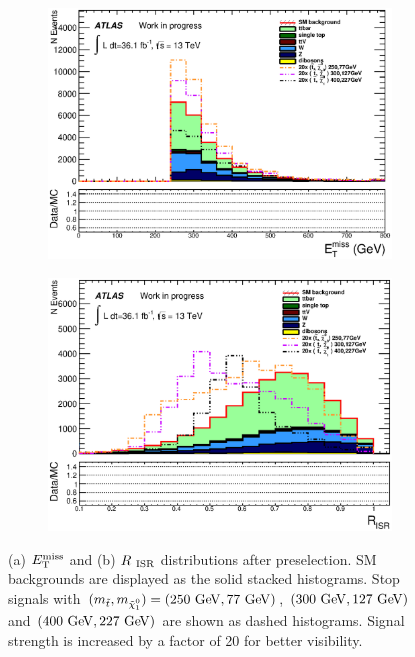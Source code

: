 \begin{figure}[h!]
  \begin{center}
    \begin{subfigure}[a]{0.45\textwidth}    
    	\includegraphics[width=\textwidth]{figures/plotSR/SR_eT_miss_0SR.eps}\hspace{0.05\textwidth}
                \caption{ }
                \label{fig:presel_dist_met} 
    \end{subfigure}
    \begin{subfigure}[b]{0.45\textwidth}
    	\includegraphics[width=\textwidth]{figures/plotSR/SR_ND1_RISR_0SR.eps}\hspace{0.05\textwidth}
                \caption{ }
                \label{fig:presel_dist_RISR} 
    \end{subfigure}
\end{center}
\caption[$\met$ and $\RISR = \met/\PTISR$ distributions after zero lepton preselection for stop signal and SM background]{ (a) $\met$ and (b) $R_{~\mathrm{ISR}}$ distributions after preselection.  SM backgrounds are displayed as the solid stacked histograms.  Stop signals with $(m_{\stop}, m_{\ninoone}) = (250 \gev,77 \gev)$, $(300 \gev, 127 \gev)$ and $(400 \gev, 227 \gev)$ are shown as dashed histograms.  Signal strength is increased by a factor of 20 for better visibility. }
\label{fig:presel_dist_2} 
\end{figure}

